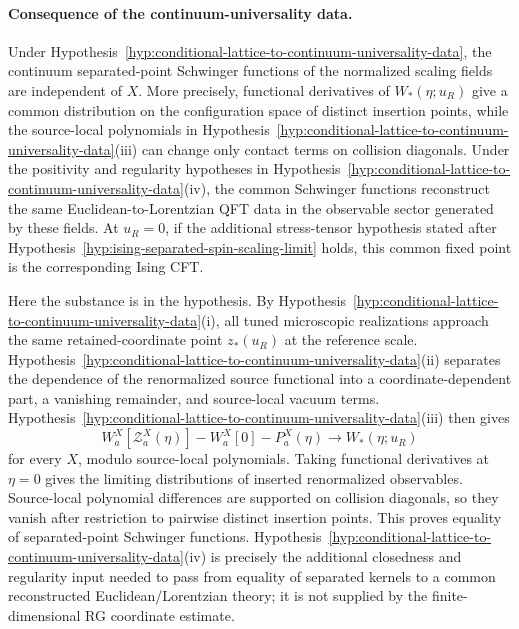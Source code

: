 \paragraph{Consequence of the continuum-universality data.}
Under Hypothesis~\ref{hyp:conditional-lattice-to-continuum-universality-data},
the continuum separated-point Schwinger functions of the normalized
scaling fields are independent of \(X\).  More precisely, functional
derivatives of \(W_\ast(\eta;u_R)\) give a common distribution on the
configuration space of distinct insertion points, while the source-local
polynomials in
Hypothesis~\ref{hyp:conditional-lattice-to-continuum-universality-data}\textup{(iii)}
can change only contact terms on collision diagonals.  Under the positivity
and regularity hypotheses in
Hypothesis~\ref{hyp:conditional-lattice-to-continuum-universality-data}\textup{(iv)},
the common Schwinger functions reconstruct the same Euclidean-to-Lorentzian
QFT data in the
observable sector generated by these fields.  At \(u_R=0\), if the additional
stress-tensor hypothesis stated after
Hypothesis~\ref{hyp:ising-separated-spin-scaling-limit} holds, this common
fixed point is the corresponding Ising CFT.

Here the substance is in the hypothesis.  By
Hypothesis~\ref{hyp:conditional-lattice-to-continuum-universality-data}\textup{(i)},
all tuned microscopic realizations approach the same retained-coordinate point
\(z_\ast(u_R)\) at the reference scale.
Hypothesis~\ref{hyp:conditional-lattice-to-continuum-universality-data}\textup{(ii)}
separates the dependence of the renormalized source functional into a
coordinate-dependent part, a vanishing remainder, and source-local vacuum
terms.  Hypothesis~\ref{hyp:conditional-lattice-to-continuum-universality-data}\textup{(iii)}
then gives
\[
  W^X_a[\mathcal Z^X_a(\eta)]-W^X_a[0]-P^X_a(\eta)
  \longrightarrow
  W_\ast(\eta;u_R)
\]
for every \(X\), modulo source-local polynomials.  Taking functional
derivatives at \(\eta=0\) gives the limiting distributions of inserted
renormalized observables.  Source-local polynomial differences are supported
on collision diagonals, so they vanish after restriction to pairwise distinct
insertion points.  This proves equality of separated-point Schwinger
functions.  Hypothesis~\ref{hyp:conditional-lattice-to-continuum-universality-data}\textup{(iv)}
is precisely the additional closedness and
regularity input needed to pass from equality of separated kernels to a
common reconstructed Euclidean/Lorentzian theory; it is not supplied by the
finite-dimensional RG coordinate estimate.

